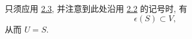 只须应用 \hyperref[cor:sga3-VIB-2.3]{2.3}, 并注意到此处沿用
\hyperref[prop:sga3-VIB-2.2]{2.2} 的记号时, 有
\[
  \epsilon(S)\subset V,
\]
从而 \(U=S\).

